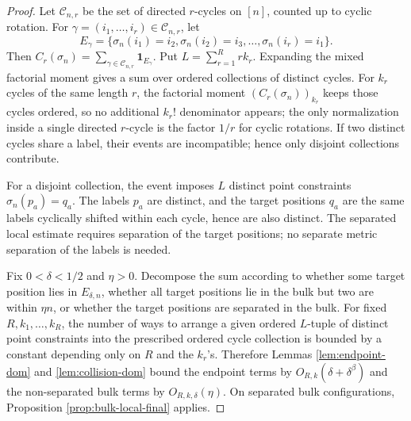 \documentclass[11pt]{article}
\theoremstyle{remark}
\newcommand{\one}{\mathbf 1}
\newcommand{\calC}{\mathcal C}
\begin{document}
\begin{proof}
Let \(\calC_{n,r}\) be the set of directed \(r\)-cycles on \([n]\), counted up to cyclic rotation.  For \(\gamma=(i_1,\ldots,i_r)\in\calC_{n,r}\), let
\[
        E_\gamma=\{\sigma_n(i_1)=i_2,
        \sigma_n(i_2)=i_3,
        \ldots,
        \sigma_n(i_r)=i_1\}.
\]
Then \(C_r(\sigma_n)=\sum_{\gamma\in\calC_{n,r}}\one_{E_\gamma}\).  Put \(L=\sum_{r=1}^R r k_r\).  Expanding the mixed factorial moment gives a sum over ordered collections of distinct cycles.  For \(k_r\) cycles of the same length \(r\), the factorial moment \((C_r(\sigma_n))_{k_r}\) keeps those cycles ordered, so no additional \(k_r!\) denominator appears; the only normalization inside a single directed \(r\)-cycle is the factor \(1/r\) for cyclic rotations.  If two distinct cycles share a label, their events are incompatible; hence only disjoint collections contribute.

For a disjoint collection, the event imposes \(L\) distinct point constraints \(\sigma_n(p_a)=q_a\).  The labels \(p_a\) are distinct, and the target positions \(q_a\) are the same labels cyclically shifted within each cycle, hence are also distinct.  The separated local estimate requires separation of the target positions; no separate metric separation of the labels is needed.

Fix \(0<\delta<1/2\) and \(\eta>0\).  Decompose the sum according to whether some target position lies in \(E_{\delta,n}\), whether all target positions lie in the bulk but two are within \(\eta n\), or whether the target positions are separated in the bulk.  For fixed \(R,k_1,\ldots,k_R\), the number of ways to arrange a given ordered \(L\)-tuple of distinct point constraints into the prescribed ordered cycle collection is bounded by a constant depending only on \(R\) and the \(k_r\)'s.  Therefore Lemmas \ref{lem:endpoint-dom} and \ref{lem:collision-dom} bound the endpoint terms by \(O_{R,k}(\delta+\delta^\beta)\) and the non-separated bulk terms by \(O_{R,k,\delta}(\eta)\).  On separated bulk configurations, Proposition \ref{prop:bulk-local-final} applies.


\end{proof}
\end{document}
